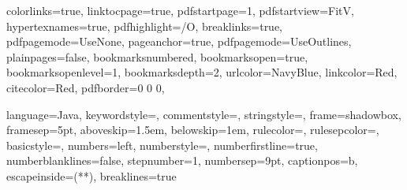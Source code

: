 \graphicspath{{figures/}{../figures/}}

\hypersetup %
{
	colorlinks=true,
	linktocpage=true, 
	pdfstartpage=1,
	pdfstartview=FitV,
	hypertexnames=true,
	pdfhighlight=/O,
	breaklinks=true,
	pdfpagemode=UseNone,
	pageanchor=true,
	pdfpagemode=UseOutlines,
	plainpages=false,
	bookmarksnumbered,
	bookmarksopen=true,
	bookmarksopenlevel=1,
	bookmarksdepth=2,
	urlcolor=NavyBlue,
	linkcolor=Red,
	citecolor=Red,
	pdfborder={0 0 0},
}

\lstset %
{
	language=Java,
	keywordstyle=\color{RoyalBlue},
    commentstyle=\color{Green}\ttfamily,
    stringstyle=\color{Red}\ttfamily,
	frame=shadowbox,
	framesep=5pt,
	aboveskip=1.5em,
	belowskip=1em,
	rulecolor=\color{blue!40!black},
	rulesepcolor=\color{white!93!black},
	basicstyle=\ttfamily\normalsize,
	numbers=left,
	numberstyle=\tiny,
	numberfirstline=true,
	numberblanklines=false,
	stepnumber=1,
	numbersep=9pt,	
	captionpos=b,
	escapeinside={(*}{*)},
	breaklines=true
}

\usetikzlibrary{shapes,arrows,external,petri}


